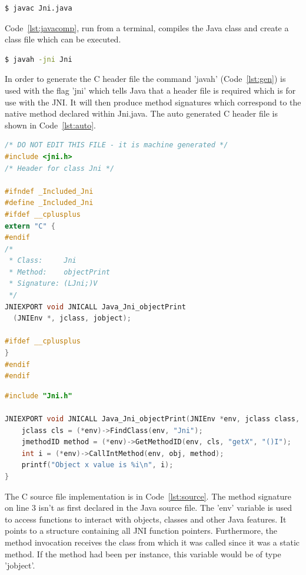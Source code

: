 \documentclass[final_report.tex]{subfiles}
\begin{document}
\begin{lstlisting}[language=sh, caption={Compiling basic Java program}, label=lst:javacomp]
$ javac Jni.java
\end{lstlisting}

Code~\ref{lst:javacomp}, run from a terminal, compiles the Java class and create a class file which can be executed.

\begin{lstlisting}[language=sh, caption={Generating C header file}, label=lst:gen]
$ javah -jni Jni
\end{lstlisting}

In order to generate the C header file the command 'javah' (Code~\ref{lst:gen}) is used with the flag 'jni' which tells Java that a header file is required which is for use with the JNI. It will then produce method signatures which correspond to the native method declared within Jni.java. The auto generated C header file is shown in Code~\ref{lst:auto}.

\begin{lstlisting}[language=C, caption={Auto-generated C header file}, label=lst:auto]
/* DO NOT EDIT THIS FILE - it is machine generated */
#include <jni.h>
/* Header for class Jni */

#ifndef _Included_Jni
#define _Included_Jni
#ifdef __cplusplus
extern "C" {
#endif
/*
 * Class:     Jni
 * Method:    objectPrint
 * Signature: (LJni;)V
 */
JNIEXPORT void JNICALL Java_Jni_objectPrint
  (JNIEnv *, jclass, jobject);

#ifdef __cplusplus
}
#endif
#endif
\end{lstlisting}

\begin{lstlisting}[language=C, caption={C source file corresponding to auto-generated header file}, label=lst:source]
#include "Jni.h"

JNIEXPORT void JNICALL Java_Jni_objectPrint(JNIEnv *env, jclass class, jobject obj) {
	jclass cls = (*env)->FindClass(env, "Jni");
	jmethodID method = (*env)->GetMethodID(env, cls, "getX", "()I");
	int i = (*env)->CallIntMethod(env, obj, method);
	printf("Object x value is %i\n", i);
}
\end{lstlisting}

The C source file implementation is in Code~\ref{lst:source}. The method signature on line 3 isn't as first declared in the Java source file. The 'env' variable is used to access functions to interact with objects, classes and other Java features. It points to a structure containing all JNI function pointers. Furthermore, the method invocation receives the class from which it was called since it was a static method. If the method had been per instance, this variable would be of type 'jobject'.
\end{document}

